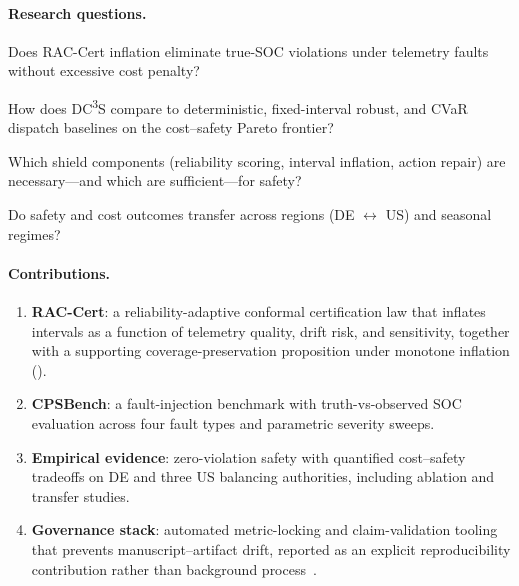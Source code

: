 \documentclass[11pt,a4paper,twocolumn]{article}
\begin{document}
\paragraph{Research questions.}
\begin{description}[leftmargin=1em,topsep=2pt,itemsep=1pt]
  \item[\textbf{RQ1}] Does RAC-Cert inflation eliminate true-SOC violations under telemetry faults without excessive cost penalty?
  \item[\textbf{RQ2}] How does DC\textsuperscript{3}S compare to deterministic, fixed-interval robust, and CVaR dispatch baselines on the cost--safety Pareto frontier?
  \item[\textbf{RQ3}] Which shield components (reliability scoring, interval inflation, action repair) are necessary---and which are sufficient---for safety?
  \item[\textbf{RQ4}] Do safety and cost outcomes transfer across regions (DE $\leftrightarrow$ US) and seasonal regimes?
\end{description}

\paragraph{Contributions.}
\begin{enumerate}[leftmargin=*,topsep=2pt,itemsep=1pt]
  \item \textbf{RAC-Cert}: a reliability-adaptive conformal certification law that inflates intervals as a function of telemetry quality, drift risk, and sensitivity, together with a supporting coverage-preservation proposition under monotone inflation ().
  \item \textbf{CPSBench}: a fault-injection benchmark with truth-vs-observed SOC evaluation across four fault types and parametric severity sweeps.
  \item \textbf{Empirical evidence}: zero-violation safety with quantified cost--safety tradeoffs on DE and three US balancing authorities, including ablation and transfer studies.
  \item \textbf{Governance stack}: automated metric-locking and claim-validation tooling that prevents manuscript--artifact drift, reported as an explicit reproducibility contribution rather than background process~\cite{pineau2021improving}.
\end{enumerate}

\end{document}
